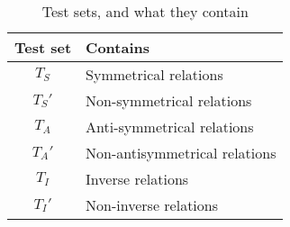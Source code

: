 \begin{table}[htb]
\centering
\begin{minipage}{0.95\columnwidth}
\centering
\caption{Test sets, and what they contain}
\vspace{-3mm}

\begin{tabular}{c|l}\hline
Test set & Contains \\ \hline
$T_S$ & Symmetrical relations \\ 
$T_S'$ & Non-symmetrical relations \\ 
$T_A$ & Anti-symmetrical relations \\ 
$T_A'$ & Non-antisymmetrical relations \\ 
$T_I$ & Inverse relations \\ 
$T_I'$ & Non-inverse relations \\ \hline
\end{tabular}

\label{tab:test_set_explanations}
\end{minipage}
\end{table}

